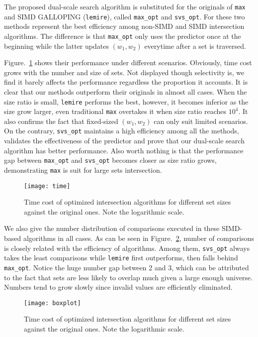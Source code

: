 The proposed dual-scale search algorithm is substituted for the originals of \texttt{max} and SIMD GALLOPING (\texttt{lemire}), called \texttt{max\_opt} and \texttt{svs\_opt}.
For these two methods represent the best efficiency among non-SIMD and SIMD intersection algorithms.
The difference is that \texttt{max\_opt} only uses the predictor once at the beginning while the latter updates $ (w_1,w_2) $ everytime after a set is traversed.

Figure.~\ref{fig: time} shows their performance under different scenarios.
Obviously, time cost grows with the number and size of sets.
Not displayed though selectivity is, we find it barely affects the performance regardless the proportion it accounts.
It is clear that our methods outperform their originals in almost all cases.
When the size ratio is small, \texttt{lemire} performs the best, however, it becomes inferior as the size grow larger, even traditional \texttt{max} overtakes it when size ratio reaches $ 10^4 $.
It also confirms the fact that fixed-sized $ (w_1,w_2) $ can only suit limited scenarios.
On the contrary, \texttt{svs\_opt} maintains a high efficiency among all the methods, validates the effectiveness of the predictor and prove that our dual-scale search algorithm has better performance.
Also worth nothing is that the performance gap between \texttt{max\_opt} and \texttt{svs\_opt} becomes closer as size ratio grows, demonstrating \texttt{max} is suit for large sets intersection.
\begin{figure}
	\centering
	\texttt{[image: time]}
	\caption{Time cost of optimized intersection algorithms for different set sizes against the original ones. Note the logarithmic scale.}
	\label{fig: time}
\end{figure}

We also give the number distribution of comparisons executed in these SIMD-based algorithms in all cases.
As can be seen in Figure.~\ref{fig: boxplot}, number of comparisons is closely related with the efficiency of algorithms.
Among them, \texttt{svs\_opt} always takes the least comparisons while \texttt{lemire} first outperforms, then falls behind \texttt{max\_opt}.
Notice the huge number gap between 2 and 3, which can be attributed to the fact that sets are less likely to overlap much given a large enough universe.
Numbers tend to grow slowly since invalid values are efficiently eliminated.
\begin{figure}
	\centering
	\texttt{[image: boxplot]}
	\caption{Time cost of optimized intersection algorithms for different set sizes against the original ones. Note the logarithmic scale.}
	\label{fig: boxplot}
\end{figure}

